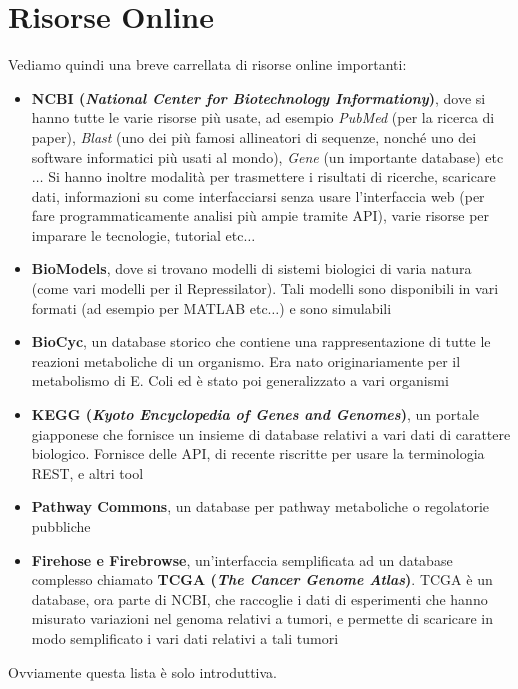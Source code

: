 \documentclass[a4paper,12pt, oneside]{book}
\begin{document}
\section{Risorse Online}
Vediamo quindi una breve carrellata di risorse online importanti:
\begin{itemize}
  \item \textbf{NCBI (\textit{National Center for Biotechnology Informationy})},
  dove si hanno tutte le varie risorse più usate, ad esempio \textit{PubMed}
  (per la ricerca di paper), \textit{Blast} (uno dei più famosi allineatori di
  sequenze, nonché uno dei software informatici più usati al mondo),
  \textit{Gene} (un importante database) etc$\ldots$ Si hanno inoltre modalità
  per trasmettere i risultati di ricerche, scaricare dati, informazioni su
  come interfacciarsi senza usare l'interfaccia web (per fare programmaticamente
  analisi più ampie tramite API), varie risorse per imparare le tecnologie,
  tutorial etc$\ldots$ 
  \item \textbf{BioModels}, dove si trovano modelli di sistemi biologici di
  varia natura (come vari modelli per il Repressilator). Tali modelli sono
  disponibili in vari formati (ad esempio per MATLAB etc$\ldots$) e sono
  simulabili  
  \item \textbf{BioCyc}, un database storico che contiene una rappresentazione
  di tutte le reazioni metaboliche di un organismo. Era nato originariamente per
  il metabolismo di E. Coli ed è stato poi generalizzato a vari organismi
  \item \textbf{KEGG (\textit{Kyoto Encyclopedia of Genes and Genomes})}, un
  portale giapponese che fornisce un insieme di database relativi a vari dati di
  carattere biologico. Fornisce delle API, di recente riscritte per usare la
  terminologia REST, e altri tool
  \item \textbf{Pathway Commons}, un database per pathway metaboliche o
  regolatorie pubbliche
  \item \textbf{Firehose e Firebrowse}, un'interfaccia semplificata ad un
  database complesso chiamato \textbf{TCGA (\textit{The Cancer Genome
      Atlas})}. TCGA è un database, ora parte di NCBI, che raccoglie i dati di
  esperimenti che hanno misurato variazioni nel genoma relativi a tumori, e
  permette di scaricare in modo semplificato i vari dati relativi a tali tumori
\end{itemize}
Ovviamente questa lista è solo introduttiva.
\end{document}
